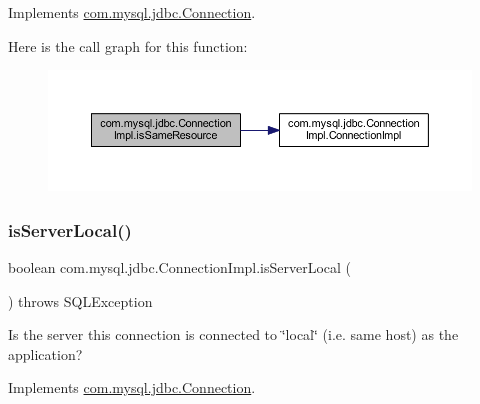 Implements \mbox{\hyperlink{interfacecom_1_1mysql_1_1jdbc_1_1_connection_a3663c7e933a14a8cc26e16d0f78956a6}{com.\+mysql.\+jdbc.\+Connection}}.

Here is the call graph for this function\+:\nopagebreak
\begin{figure}[H]
\begin{center}
\leavevmode
\includegraphics[width=350pt]{classcom_1_1mysql_1_1jdbc_1_1_connection_impl_a18299d4f2cf6b1092dfb30b5fbd33a5c_cgraph}
\end{center}
\end{figure}
\mbox{\label{classcom_1_1mysql_1_1jdbc_1_1_connection_impl_a88cfb69a36df841dccfba314da816213}} 
\subsubsection{\texorpdfstring{is\+Server\+Local()}{isServerLocal()}}
{\footnotesize\ttfamily boolean com.\+mysql.\+jdbc.\+Connection\+Impl.\+is\+Server\+Local (\begin{DoxyParamCaption}{ }\end{DoxyParamCaption}) throws S\+Q\+L\+Exception}

Is the server this connection is connected to \char`\"{}local\char`\"{} (i.\+e. same host) as the application? 

Implements \mbox{\hyperlink{interfacecom_1_1mysql_1_1jdbc_1_1_connection_a37eb25137505b9aaf4b25a847f87e949}{com.\+mysql.\+jdbc.\+Connection}}.

